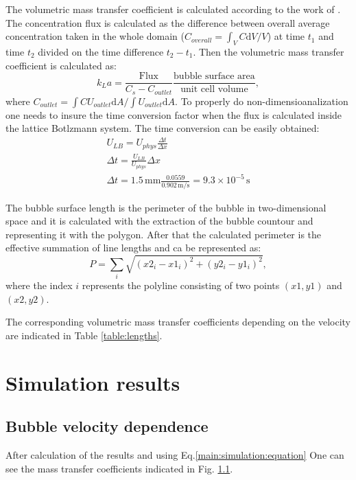\documentclass{article}
\begin{document}
The volumetric mass transfer coefficient is calculated according to the work of
\citet{vanbaten-circular}. The concentration flux is calculated as the difference between overall
average concentration taken in the whole domain ($C_{overall}=\int_{V} C \mathrm{d}V /V$) at time
$t_1$ and time $t_2$ divided on the time difference $t_2-t_1$. Then the volumetric mass transfer
coefficient is calculated as:
\begin{equation}
\label{main:simulation:equation}
k_L a=\frac{\text{Flux}}{C_s-C_{outlet}} \frac{\text{bubble surface area}}{\text{unit cell volume}},
\end{equation}
where $C_{outlet}=\int{C U_{outlet}\mathrm{d}A}/\int{U_{outlet}\mathrm{d}A}$. To properly do
non-dimensioanalization one needs to insure the time conversion factor when the flux is calculated
inside the lattice Botlzmann system. The time conversion can be easily obtained:
\begin{equation}
\begin{aligned}
U_{LB}=U_{phys}\frac{\Delta t}{\Delta x}\\
\Delta t=\frac{U_{LB}}{U_{phys}}\Delta x\\
\Delta t=1.5\,\mathrm{mm} \frac{0.0559}{0.902\,\mathrm{m/s}}=9.3\times 10^{-5}\,\mathrm{s} 
\end{aligned}
\end{equation}

The bubble surface length is the perimeter of the bubble in two-dimensional space and it is
calculated with the extraction of the bubble countour and representing it with the polygon. After
that the calculated perimeter is the effective summation of line lengths and ca be represented as:
\begin{equation}
P=\sum_i{\sqrt{(x2_i-x1_i)^2+(y2_i-y1_i)^2}},
\end{equation}
where the index $i$ represents the polyline consisting of two points $(x1,y1)$ and $(x2,y2)$.

The corresponding volumetric mass transfer coefficients depending on the velocity are indicated in
Table \ref{table:lengths}.


\section{Simulation results}


\subsection{Bubble velocity dependence}
After calculation of the results and using Eq.\ref{main:simulation:equation} One can see the mass
transfer coefficients indicated in Fig. \ref{}.
\end{document}
